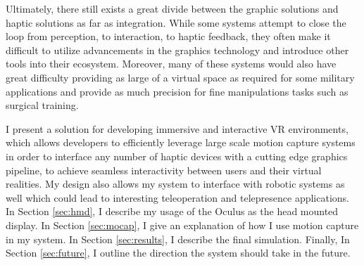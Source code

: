 Ultimately, there still exists a great divide between the graphic solutions and
haptic solutions as far as integration. While some systems attempt to close the
loop from perception, to interaction, to haptic feedback, they often make it
difficult to utilize advancements in the graphics technology and introduce
other tools into their ecosystem.  Moreover, many of these systems would also
have great difficulty providing as large of a virtual space as required for
some military applications and provide as much precision for fine manipulations
tasks such as surgical training.

I present a solution for developing immersive and interactive VR environments,
which allows developers to efficiently leverage large scale motion capture
systems in order to interface any number of haptic devices with a cutting edge
graphics pipeline, to achieve seamless interactivity between users and their
virtual realities. My design also allows my system to interface with robotic
systems as well which could lead to interesting teleoperation and telepresence
applications. In Section \ref{sec:hmd}, I describe my usage of the Oculus as
the head mounted display. In Section \ref{sec:mocap}, I give an explanation
of how I use motion capture in my system. In Section \ref{sec:results}, I
describe the final simulation. Finally, In Section \ref{sec:future}, I outline
the direction the system should take in the future.
